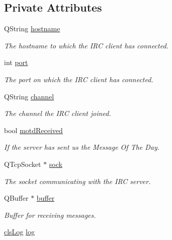 \subsection*{Private Attributes}
\begin{DoxyCompactItemize}
\item 
Q\-String \hyperlink{classserver_1_1irc_client_a8a5a50ebf84488f46df38bfba2c692bd}{hostname}
\begin{DoxyCompactList}\small\item\em The hostname to which the I\-R\-C client has connected. \end{DoxyCompactList}\item 
int \hyperlink{classserver_1_1irc_client_a177e57fc5b5e19d591702644dd2a98e1}{port}
\begin{DoxyCompactList}\small\item\em The port on which the I\-R\-C client has connected. \end{DoxyCompactList}\item 
Q\-String \hyperlink{classserver_1_1irc_client_a01d41f735fe9f0227b72e794c060a798}{channel}
\begin{DoxyCompactList}\small\item\em The channel the I\-R\-C client joined. \end{DoxyCompactList}\item 
bool \hyperlink{classserver_1_1irc_client_aa5a321d1684c24415e65752c0359de2d}{motd\-Received}
\begin{DoxyCompactList}\small\item\em If the server has sent us the Message Of The Day. \end{DoxyCompactList}\item 
Q\-Tcp\-Socket $\ast$ \hyperlink{classserver_1_1irc_client_a9dffc339852e3c1e39983b56b921550c}{sock}
\begin{DoxyCompactList}\small\item\em The socket communicating with the I\-R\-C server. \end{DoxyCompactList}\item 
Q\-Buffer $\ast$ \hyperlink{classserver_1_1irc_client_a58971045560368c18f171ef0acf1c7f9}{buffer}
\begin{DoxyCompactList}\small\item\em Buffer for receiving messages. \end{DoxyCompactList}\item 
\hyperlink{class_k4_u_1_1cls_log}{cls\-Log} \hyperlink{classserver_1_1irc_client_ae6f6e1a1512ba04edd299f21876a84d9}{log}

\end{DoxyCompactItemize}
